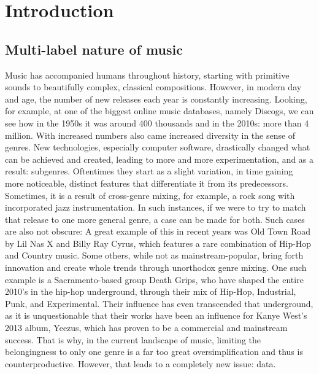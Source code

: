 \documentclass[runningheads]{llncs}
\begin{document}
\section{Introduction}
\subsection{Multi-label nature of music}
Music has accompanied humans throughout history, starting with primitive sounds to beautifully complex, classical compositions. However, in modern day and age, the number of new releases each year is constantly increasing. Looking, for example, at one of the biggest online music databases, namely Discogs, we can see how in the 1950s it was around 400 thousands and in the 2010s: more than 4 million. With increased numbers also came increased diversity in the sense of genres. New technologies, especially computer software, drastically changed what can be achieved and created, leading to more and more experimentation, and as a result: subgenres. Oftentimes they start as a slight variation, in time gaining more noticeable, distinct features that differentiate it from its predecessors. Sometimes, it is a result of cross-genre mixing, for example, a rock song with incorporated jazz instrumentation. In such instances, if we were to try to match that release to one more general genre, a case can be made for both. Such cases are also not obscure: A great example of this in recent years was Old Town Road by Lil Nas X and Billy Ray Cyrus, which features a rare combination of Hip-Hop and Country music. Some others, while not as mainstream-popular, bring forth innovation and create whole trends through unorthodox genre mixing. One such example is a Sacramento-based group Death Grips, who have shaped the entire 2010’s in the hip-hop underground, through their mix of Hip-Hop, Industrial, Punk, and Experimental. Their influence has even transcended that underground, as it is unquestionable that their works have been an influence for Kanye West’s 2013 album, Yeezus, which has proven to be a commercial and mainstream success. That is why, in the current landscape of music, limiting the belongingness to only one genre is a far too great oversimplification and thus is counterproductive. However, that leads to a completely new issue: data. 
\end{document}
